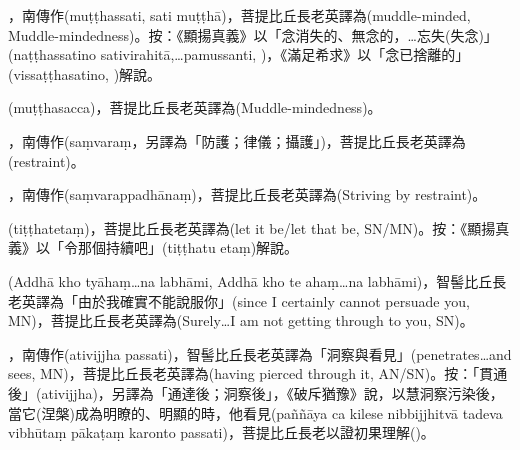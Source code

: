 \startitemgroup[noteitems]
\item{}，南傳作(muṭṭhassati, sati muṭṭhā)，菩提比丘長老英譯為(muddle-minded, Muddle-mindedness)。按：《顯揚真義》以「念消失的、無念的，…忘失(失念)」(naṭṭhassatino sativirahitā,…pamussanti, )，《滿足希求》以「念已捨離的」(vissaṭṭhasatino, )解說。
\item{}(muṭṭhasacca)，菩提比丘長老英譯為(Muddle-mindedness)。
\stopitemgroup

\startitemgroup[noteitems]
\item{}，南傳作(saṃvaraṃ，另譯為「防護；律儀；攝護」)，菩提比丘長老英譯為(restraint)。
\item{}，南傳作(saṃvarappadhānaṃ)，菩提比丘長老英譯為(Striving by restraint)。
\stopitemgroup

\startitemgroup[noteitems]
\item{}(tiṭṭhatetaṃ)，菩提比丘長老英譯為(let it be/let that be, SN/MN)。按：《顯揚真義》以「令那個持續吧」(tiṭṭhatu etaṃ)解說。
\item{}(Addhā kho tyāhaṃ…na labhāmi, Addhā kho te ahaṃ…na labhāmi)，智髻比丘長老英譯為「由於我確實不能說服你」(since I certainly cannot persuade you, MN)，菩提比丘長老英譯為(Surely…I am not getting through to you, SN)。
\stopitemgroup

\startitemgroup[noteitems]
\item{}，南傳作(ativijjha passati)，智髻比丘長老英譯為「洞察與看見」(penetrates…and sees, MN)，菩提比丘長老英譯為(having pierced through it, AN/SN)。按：「貫通後」(ativijjha)，另譯為「通達後；洞察後」，《破斥猶豫》說，以慧洞察污染後，當它(涅槃)成為明瞭的、明顯的時，他看見(paññāya ca kilese nibbijjhitvā tadeva vibhūtaṃ pākaṭaṃ karonto passati)，菩提比丘長老以證初果理解()。
\stopitemgroup

